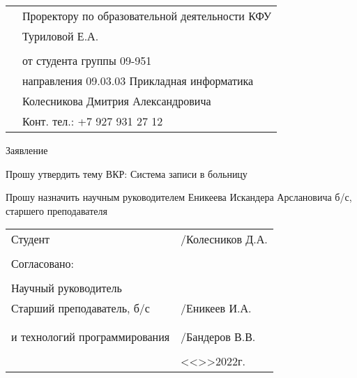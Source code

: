 \documentclass[a4paper]{article}
\begin{document}
    \begin{titlepage}
        \begin{xltabular}{\textwidth} {
                >{\hsize} X
                >{\hsize} X }
            & Проректору по образовательной деятельности КФУ \\
            & Туриловой Е.А. \\
            & \\
            & от студента группы 09-951 \\
            & направления 09.03.03 Прикладная информатика \\
            & Колесникова Дмитрия Александровича \\
            & Конт. тел.: +7 927 931 27 12 \\
        \end{xltabular}

        \begin{center}
            Заявление
        \end{center}

        \begin{flushleft}
            Прошу утвердить тему ВКР: Система записи в больницу \\
        \end{flushleft}

        \begin{flushleft}
            Прошу назначить научным руководителем Еникеева Искандера Арслановича б/с, старшего преподавателя
        \end{flushleft}

        \vfill

        \begin{xltabular}{\textwidth} {
                >{\hsize} X
                >{\hsize} X }
            Студент & \underline{\hspace{3cm}}/Колесников Д.А. \\
            & \\
            Согласовано: & \\
            & \\
            Научный руководитель & \\
            Старший преподаватель, б/с & \underline{\hspace{3cm}}/Еникеев И.А. \\
            & \\
             \\
            и технологий программирования & \underline{\hspace{3cm}}/Бандеров В.В. \\
            & \\
            & <<\underline{\hspace{1cm}}>>\underline{\hspace{3cm}}2022г. \\
        \end{xltabular}
    \end{titlepage}
\end{document}
